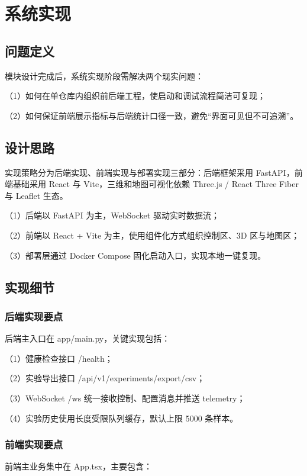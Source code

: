 
\section{系统实现}

\subsection{问题定义}
模块设计完成后，系统实现阶段需解决两个现实问题：

（1）如何在单仓库内组织前后端工程，使启动和调试流程简洁可复现；

（2）如何保证前端展示指标与后端统计口径一致，避免“界面可见但不可追溯”。

\subsection{设计思路}
实现策略分为后端实现、前端实现与部署实现三部分：后端框架采用 FastAPI\cite{fastapi_docs}，前端基础采用 React 与 Vite\cite{react_docs,vite_docs}，三维和地图可视化依赖 Three.js / React Three Fiber 与 Leaflet 生态\cite{threejs_docs,r3f_docs,leaflet_docs}。

（1）后端以 FastAPI 为主，WebSocket 驱动实时数据流；

（2）前端以 React + Vite 为主，使用组件化方式组织控制区、3D 区与地图区；

（3）部署层通过 Docker Compose 固化启动入口，实现本地一键复现。

\subsection{实现细节}
\subsubsection{后端实现要点}
后端主入口在 app/main.py，关键实现包括：

（1）健康检查接口 /health；

（2）实验导出接口 /api/v1/experiments/export/csv；

（3）WebSocket /ws 统一接收控制、配置消息并推送 telemetry；

（4）实验历史使用长度受限队列缓存，默认上限 5000 条样本。

\subsubsection{前端实现要点}
前端主业务集中在 App.tsx，主要包含：

